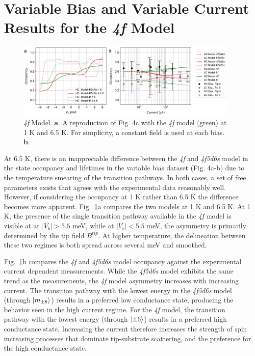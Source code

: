 \documentclass[reprint,amsmath,amssymb,aps,nofootinbib,onecolumn]{revtex4-2}
\begin{document}
\section{Variable Bias and Variable Current Results for the \textit{4f} Model}
\begin{figure}[h!]
\includegraphics[width=0.98\textwidth]{model_4f.pdf}
\caption{\textit{4f} Model. \textbf{a}. A reproduction of Fig. 4c with the \textit{4f} model (green) at 1 K and 6.5 K. For simplicity, a constant field is used at each bias.  \textbf{b}.
\label{fig:bias_curr} }
\end{figure}

At 6.5 K, there is an inappreciable difference between the \textit{4f} and \textit{4f5d6s} model in the state occupancy and lifetimes in the variable bias dataset (Fig. 4a-b) due to the temperature smearing of the transition pathways. In both cases, a set of free parameters exists that agrees with the experimental data reasonably well. However, if considering the occupancy at 1 K rather than 6.5 K the difference becomes more apparent. Fig.~\ref{fig:bias_curr}a compares the two models at 1 K and 6.5 K. At 1 K, the presence of the single transition pathway available in the \textit{4f} model is visible at at $|V_b|>5.5$ meV, while at $|V_b|<5.5$ meV, the asymmetry is primarily determined by the tip field $B^{tip}$. At higher temperature, the delineation between these two regimes is both spread across several meV and smoothed.   

Fig.~\ref{fig:bias_curr}b compares the \textit{4f} and \textit{4f5d6s} model occupancy against the experimental current dependent measurements. While the \textit{4f5d6s} model exhibits the same trend as the measurements, the \textit{4f} model asymmetry increases with increasing current. The transition pathway with the lowest energy in the \textit{4f5d6s} model (through $\ket{m_{\pm 8}}$) results in a preferred low conductance state, producing the behavior seen in the high current regime. For the \textit{4f} model, the transition pathway with the lowest energy (through $\ket{\pm 6}$) results in a preferred high conductance state. Increasing the current therefore increases the strength of spin increasing processes that dominate tip-substrate scattering, and the preference for the high conductance state.  
\end{document}
